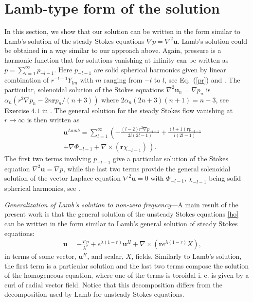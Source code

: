 \documentclass[aps,prx,twocolumn,amsmath,amssymb,amsfonts]{revtex4-2}
\begin{document}
\section{Lamb-type form of the solution} \label{Lambs}

In this section, we show that our solution can be written in the form similar to Lamb's solution \cite{Lamb} of the steady Stokes equations $\nabla p=\nabla^2\bm u$. Lamb's solution could be obtained in a way similar to our approach above.  Again, pressure is a harmonic function that
for solutions vanishing at infinity can be written as $p=\sum_{l=1}^{\infty}p_{-l-1}$. Here $p_{-l-1}$ are solid spherical harmonics given by linear combination of $r^{-l-1}Y_{lm}$ with $m$ ranging from $-l$ to $l$, see Eq.~(\ref{pr}) and \cite{kim}. The particular, solenoidal solution of the Stokes equations $\nabla^2 \bm u_n=\nabla p_n$ is $\alpha_n\left( r^2\nabla p_n-2n \bm r p_n/(n+3)\right)$ where $2\alpha_n (2n+3)(n+1)=n+3$, see Exercise $4.1$ in \cite{kim}. The general solution for the steady Stokes flow vanishing at $r\to \infty$ is then written as
\begin{eqnarray}&&\!\!\!\!\!\!\!
\bm u^{Lamb}=\sum_{l=1}^{\infty}\left(-\frac{(l-2)r^2\nabla p_{-l-1}}{2l(2l-1)}+\frac{(l+1)\bm r p_{-l-1}}{l(2l-1)}\right.
\nonumber\\&&\!\!\!\!\!\!\!\left.+\nabla\Phi_{-l-1}+\nabla\times (\bm r\chi_{-l-1})\frac{}{}\right).\label{Lamb}
\end{eqnarray}
The first two terms involving $p_{-l-1}$ give a particular solution of the Stokes equation $\nabla^2 \bm u=\nabla p$, while the last two terms provide the general solenoidal solution of the vector Laplace equation $\nabla^2 \bm u=0$ with $\Phi_{-l-1}$, $\chi_{-l-1}$ being solid spherical harmonics, see \cite{kim}.

\textit{Generalization of Lamb's solution to non-zero frequency}---A main result of the present work is that the general solution of the unsteady Stokes equations \ref{ho} can be written in the form similar to Lamb's general solution of steady Stokes equations:
\begin{eqnarray}&&\!\!\!\!\!\!\!\!\!\!\!\!\!\!\!\!
\bm u=-\frac{\nabla p}{\lambda^2}+e^{\lambda (1-r)} \bm u^H+\nabla\times (\bm r e^{\lambda (1-r)}X), \label{su}
\end{eqnarray}
in terms of some vector, $\bm u^H$, and scalar, $X$, fields. Similarly to Lamb's solution, the first term is a particular solution and the last two terms compose the solution of the homogeneous equation, where one of the terms is toroidal i. e. is given by a curl of radial vector field. Notice that this decomposition differs from the decomposition used by Lamb for unsteady Stokes equations.
\end{document}
